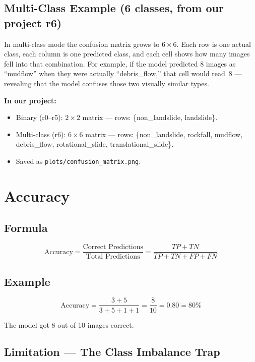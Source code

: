 \documentclass[11pt]{article}
\begin{document}
\subsection{Multi-Class Example (6 classes, from our project r6)}

In multi-class mode the confusion matrix grows to $6 \times 6$.
Each row is one actual class, each column is one predicted class, and each cell shows how many images fell into that combination.
For example, if the model predicted 8 images as ``mudflow'' when they were actually ``debris\_flow,'' that cell would read~8 --- revealing that the model confuses those two visually similar types.

\medskip
\noindent\textbf{In our project:}
\begin{itemize}[noitemsep]
    \item Binary (r0--r5): $2 \times 2$ matrix --- rows: \{non\_landslide, landslide\}.
    \item Multi-class (r6): $6 \times 6$ matrix --- rows: \{non\_landslide, rockfall, mudflow, debris\_flow, rotational\_slide, translational\_slide\}.
    \item Saved as \texttt{plots/confusion\_matrix.png}.
\end{itemize}

\section{Accuracy}

\subsection{Formula}
\[
\text{Accuracy} = \frac{\text{Correct Predictions}}{\text{Total Predictions}} = \frac{TP + TN}{TP + TN + FP + FN}
\]

\subsection{Example}
\[
\text{Accuracy} = \frac{3 + 5}{3 + 5 + 1 + 1} = \frac{8}{10} = 0.80 = \boxed{80\%}
\]

\noindent The model got 8 out of 10 images correct.

\subsection{Limitation --- The Class Imbalance Trap}
\end{document}
